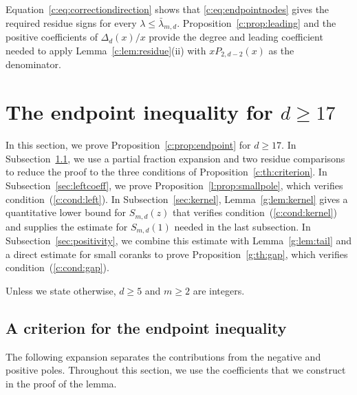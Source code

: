 \documentclass[10pt,a4paper]{article}
\numberwithin{equation}{section}
\theoremstyle{remark}\newtheorem{remark}[theorem]{Remark}
\begin{document}
Equation~\eqref{c:eq:correctiondirection} shows that
\eqref{c:eq:endpointnodes} gives the required residue signs for every
$\lambda\le\bar\lambda_{m,d}$.
Proposition~\ref{c:prop:leading} and the positive coefficients of
$\Delta_d(x)/x$ provide the degree and leading coefficient needed to
apply Lemma~\ref{c:lem:residue}(ii) with $xP_{2,d-2}(x)$ as the denominator.

\section{The endpoint inequality for \texorpdfstring{$d\ge17$}{d >= 17}}\label{sec:symbol}
In this section, we prove Proposition~\ref{c:prop:endpoint} for $d\ge17$.
In Subsection~\ref{sec:criterion}, we use a partial fraction expansion and
two residue comparisons to reduce the proof to the three conditions of
Proposition~\ref{c:th:criterion}.
In Subsection~\ref{sec:leftcoeff}, we prove
Proposition~\ref{l:prop:smallpole}, which verifies condition~(\ref{c:cond:left}).
In Subsection~\ref{sec:kernel}, Lemma~\ref{g:lem:kernel} gives a quantitative
lower bound for $S_{m,d}(z)$ that verifies condition~(\ref{c:cond:kernel})
and supplies the estimate for $S_{m,d}(1)$ needed in the last subsection.
In Subsection~\ref{sec:positivity}, we combine this estimate with
Lemma~\ref{g:lem:tail} and a direct estimate for small coranks to prove
Proposition~\ref{g:th:gap}, which verifies condition~(\ref{c:cond:gap}).

Unless we state otherwise, $d\ge5$ and $m\ge2$ are integers.
\subsection{A criterion for the endpoint inequality}\label{sec:criterion}
The following expansion separates the contributions from the negative and
positive poles. Throughout this section, we use the coefficients that we
construct in the proof of the lemma.
\end{document}
